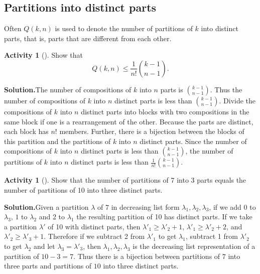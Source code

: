 \documentclass[10pt,]{book}
\theoremstyle{plain}
\theoremstyle{definition}
\newtheorem{activity}[project]{Activity}
\numberwithin{equation}{chapter}
\begin{document}
\subsection[{Partitions into distinct parts}]{Partitions into distinct parts}\label{subsection-39}
Often \(Q(k,n)\) is used to denote the number of partitions of \(k\) into distinct parts, that is, parts that are different from each other.%
\begin{activity}[]\label{activity-145}
Show that%
\begin{equation*}
Q(k,n) \le \frac{1}{n!}\binom{k-1}{n-1}.
\end{equation*}
%
\par\medskip\noindent%
\textbf{Solution.}\quad The number of compositions of \(k\) into \(n\) parts is \(\binom{k-1}{n-1}\). Thus the number of compositions of \(k\) into \(n\) distinct parts is less than \(\binom{k-1}{n-1}\). Divide the compositions of \(k\) into \(n\) distinct parts into blocks with two compositions in the same block if one is a rearrangement of the other. Because the parts are distinct, each block has \(n!\) members. Further, there is a bijection between the blocks of this partition and the partitions of \(k\) into \(n\) distinct parts. Since the number of compositions of \(k\) into \(n\) distinct parts is less than \(\binom{k-1}{n-1}\), the number of partitions of \(k\) into \(n\) distinct parts is less than \(\frac{1}{n!}  \binom{k-1}{n-1}\).%
\end{activity}
\begin{activity}[]\label{activity-146}
Show that the number of partitions of 7 into 3 parts equals the number of partitions of 10 into three distinct parts.%
\par\medskip\noindent%
\textbf{Solution.}\quad Given a partition \(\lambda\) of 7 in decreasing list form \(\lambda_1,\lambda_2,\lambda_3\), if we add 0 to \(\lambda_3\), \(1\) to \(\lambda_2\) and 2 to \(\lambda_1\) the resulting partition of 10 has distinct parts. If we take a partition \(\lambda'\) of 10 with distinct parts, then \(\lambda'_1\ge\lambda'_2+1\), \(\lambda'_1\ge\lambda'_2+2\), and \(\lambda'_2\ge \lambda'_3+1\). Therefore if we subtract 2 from \(\lambda'_1\) to get \(\lambda_1\), subtract 1 from \(\lambda'_2\) to get \(\lambda_2\) and let \(\lambda_3= \lambda'_3\), then \(\lambda_1,\lambda_2,\lambda_3\) is the decreasing list representation of a partition of \(10-3=7\). Thus there is a bijection between partitions of \(7\) into three parts and partitions of \(10\) into three distinct parts.%
\end{activity}
\end{document}

